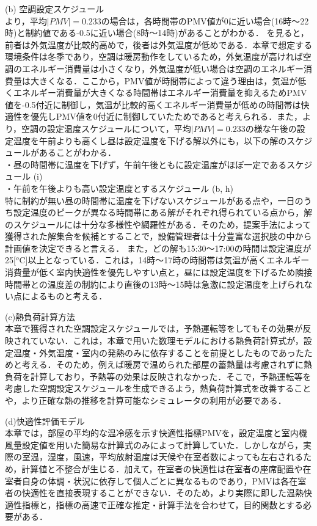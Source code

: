 (b) 空調設定スケジュール\\
より，平均$|PMV|=0.233$の場合は，各時間帯のPMV値が0に近い場合(16時～22時)と制約値である-0.5に近い場合(8時～14時)があることがわかる．
を見ると，前者は外気温度が比較的高めで，後者は外気温度が低めである．本章で想定する環境条件は冬季であり，空調は暖房動作をしているため，外気温度が高ければ空調のエネルギー消費量は小さくなり，外気温度が低い場合は空調のエネルギー消費量は大きくなる．ここから，PMV値が時間帯によって違う理由は，気温が低くエネルギー消費量が大きくなる時間帯はエネルギー消費量を抑えるためPMV値を-0.5付近に制御し，気温が比較的高くエネルギー消費量が低めの時間帯は快適性を優先しPMV値を0付近に制御していたためであると考えられる．また，より，空調の設定温度スケジュールについて，平均$|PMV|=0.233$の様な午後の設定温度を午前よりも高くし昼は設定温度を下げる解以外にも，以下の解のスケジュールがあることがわかる．\\
・昼の時間帯に温度を下げず，午前午後ともに設定温度がほぼ一定であるスケジュール (i)\\
・午前を午後よりも高い設定温度とするスケジュール (b, h)\\
特に制約が無い昼の時間帯に温度を下げないスケジュールがある点や，一日のうち設定温度のピークが異なる時間帯にある解がそれぞれ得られている点から，解のスケジュールには十分な多様性や網羅性がある．そのため，提案手法によって獲得された解集合を候補とすることで，設備管理者は十分豊富な選択肢の中から計画値を決定できると言える．
また，どの解も15:30～17:00の時間は設定温度が25[$^o$C]以上となっている．これは，14時～17時の時間帯は気温が高くエネルギー消費量が低く室内快適性を優先しやすい点と，昼には設定温度を下げるため隣接時間帯との温度差の制約により直後の13時～15時は急激に設定温度を上げられない点によるものと考える．

(c)熱負荷計算方法\\
本章で獲得された空調設定スケジュールでは，予熱運転等をしてもその効果が反映されていない．これは，本章で用いた数理モデルにおける熱負荷計算式が，設定温度・外気温度・室内の発熱のみに依存することを前提としたものであったためと考える．そのため，例えば暖房で温められた部屋の蓄熱量は考慮されずに熱負荷を計算しており，予熱等の効果は反映されなかった．そこで，予熱運転等を考慮した空調設定スケジュールを生成できるよう，熱負荷計算式を改善することや，より正確な熱の推移を計算可能なシミュレータの利用が必要である．

(d)快適性評価モデル\\
本章では，部屋の平均的な温冷感を示す快適性指標PMVを，設定温度と室内機風量設定値を用いた簡易な計算式のみによって計算していた．しかしながら，実際の室温，湿度，風速，平均放射温度は天候や在室者数によっても左右されるため，計算値と不整合が生じる．加えて，在室者の快適性は在室者の座席配置や在室者自身の体調・状況に依存して個人ごとに異なるものであり，PMVは各在室者の快適性を直接表現することができない．そのため，より実際に即した温熱快適性指標と，指標の高速で正確な推定・計算手法を合わせて，目的関数とする必要がある．

